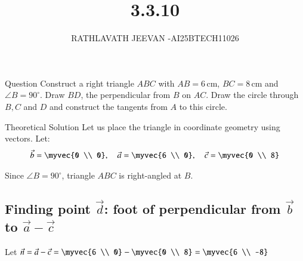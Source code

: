 \documentclass{beamer}
\title %
{3.3.10}
\author %
{RATHLAVATH JEEVAN -AI25BTECH11026}
\begin{document}
\frame{\titlepage}
\begin{frame}{Question}
  Construct a right triangle $ABC$ with $AB = 6 \, \text{cm}$, 
$BC = 8 \, \text{cm}$ and $\angle B = 90^\circ$. Draw $BD$, the perpendicular 
from $B$ on $AC$. Draw the circle through $B, C$ and $D$ and construct the 
tangents from $A$ to this circle.
\end{frame}
\begin{frame}{Theoretical Solution}
Let us place the triangle in coordinate geometry using vectors.
Let:
\begin{align}
\vec{b} = \myvec{0 \\ 0}, \quad \vec{a} = \myvec{6 \\ 0}, \quad \vec{c} = \myvec{0 \\ 8} \label{1}
\end{align}

Since \(\angle B = 90^\circ\), triangle \(ABC\) is right-angled at \(B\).


\subsection*{Finding point \( \vec{d} \): foot of perpendicular from \( \vec{b} \) to \( \vec{a} - \vec{c} \)}

Let \(\vec{n} = \vec{a} - \vec{c} = \myvec{6 \\ 0} - \myvec{0 \\ 8} = \myvec{6 \\ -8}\) \label{2}
\end{frame}
\end{document}
